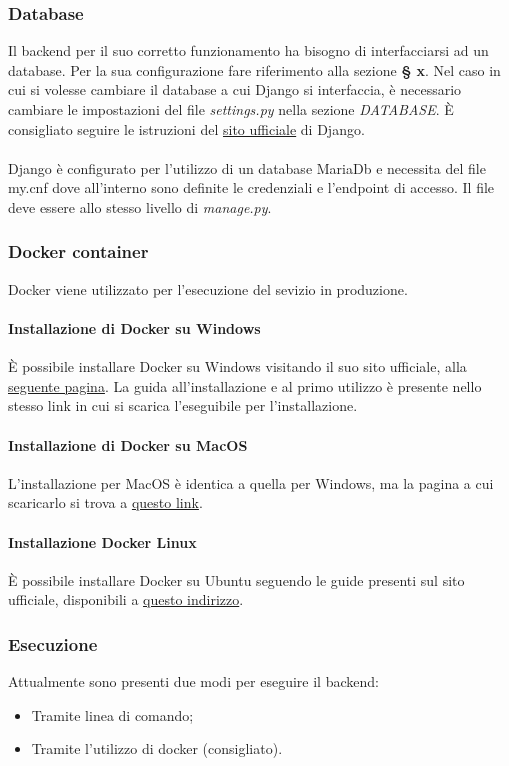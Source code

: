 \subsubsection{Database}
Il backend per il suo corretto funzionamento ha bisogno di interfacciarsi ad un database. Per la sua configurazione fare riferimento alla sezione \textbf{§ x}.
Nel caso in cui si volesse cambiare il database a cui Django si interfaccia, è necessario cambiare le impostazioni del file \textit{settings.py} nella sezione \textit{DATABASE}. È consigliato seguire le istruzioni del \href{https://docs.djangoproject.com/en/3.2/ref/databases/}{sito ufficiale} di Django.
\\
\\
Django è configurato per l'utilizzo di un database MariaDb e necessita del file my.cnf dove all'interno sono definite le credenziali e l'endpoint di accesso. Il file deve essere allo stesso livello di \textit{manage.py}.

\subsubsection{Docker container}
Docker viene utilizzato per l'esecuzione del sevizio in produzione.
\paragraph{Installazione di Docker su Windows}
È possibile installare Docker su Windows visitando il suo sito ufficiale, alla \href{https://hub.docker.com/editions/community/docker-ce-desktop-windows}{seguente pagina}. La guida all'installazione e al primo utilizzo è presente nello stesso link in cui si scarica l'eseguibile per l'installazione.
\paragraph{Installazione di Docker su MacOS}
L'installazione per MacOS è identica a quella per Windows, ma la pagina a cui scaricarlo si trova a \href{https://hub.docker.com/editions/community/docker-ce-desktop-mac}{questo link}.
\paragraph{Installazione Docker Linux}
È possibile installare Docker su Ubuntu seguendo le guide presenti sul sito ufficiale, disponibili a \href{https://docs.docker.com/engine/install/ubuntu/}{questo indirizzo}.

\subsubsection{Esecuzione}
Attualmente sono presenti due modi per eseguire il backend:
\begin{itemize}
	\item Tramite linea di comando;
	\item Tramite l'utilizzo di docker (consigliato).
\end{itemize}
